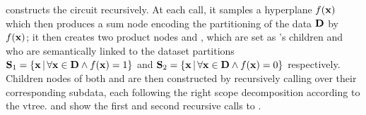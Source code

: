  constructs the circuit recursively. At each call, it samples a hyperplane
$f(\mathbf{x})$ which then produces a sum node \inode[fill=boxgreen]{\newSumNode} encoding the
partitioning of the data $\mathbf{D}$ by $f(\mathbf{x})$; it then creates two product nodes
\inode[fill=boxblue]{\newProdNode} and \inode[fill=boxred]{\newProdNode}, which are set as
\inode[fill=boxgreen]{\newSumNode}'s children and who are semantically linked to the dataset
partitions $\mathbf{S}_1=\{\mathbf{x}\,|\,\forall\mathbf{x}\in\mathbf{D}\wedge f(\mathbf{x})=1\}$ and
$\mathbf{S}_2=\{\mathbf{x}\,|\,\forall\mathbf{x}\in\mathbf{D}\wedge f(\mathbf{x})=0\}$ respectively. Children
nodes of both \inode[fill=boxblue]{\newProdNode} and \inode[fill=boxred]{\newProdNode} are then
constructed by recursively calling  over their corresponding subdata, each
following the right scope decomposition according to the vtree.  and
 show the first and second recursive calls to .

